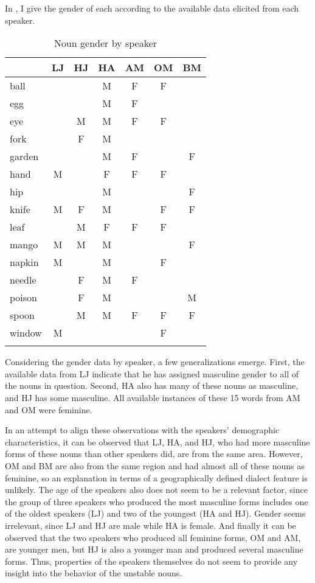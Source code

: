 \documentclass[output=paper,modfonts]{langscibook}
\begin{document}
In , I give the gender of each  according to the available data elicited from each speaker.


\begin{table}
\caption{Noun gender by speaker}
\label{ex:paster:12}
\begin{tabularx}{.55\textwidth}{Xcccccc} 
\lsptoprule
& \textbf{LJ} & \textbf{HJ} & \textbf{HA} & \textbf{AM} & \textbf{OM} & \textbf{BM}\\
\midrule
ball   &  &  & M & F & F & \\
egg    &  &  & M & F &  & \\
eye    &  & M & M & F & F & \\
fork   &  & F & M &  &  & \\
garden &  &  & M & F &  & F\\
hand   & M &  & F & F & F & \\
hip    &  &  & M &  &  & F\\
knife  & M & F & M &  & F & F\\
leaf   &  & M & F & F & F & \\
mango  & M & M & M &  &  & F\\
napkin & M &  & M &  & F & \\
needle &  & F & M & F &  & \\
poison &  & F & M &  &  & M\\
spoon  &  & M & M & F & F & F\\
window & M &  &  &  & F & \\
\lspbottomrule
\end{tabularx}
\end{table}

Considering the  gender data by speaker, a few generalizations emerge. First, the available data from LJ indicate that he has assigned masculine gender to all of the nouns in question. Second, HA also has many of these nouns as masculine, and HJ has some masculine. All available instances of these 15 words from AM and OM were feminine.

In an attempt to align these observations with the speakers’ demographic characteristics, it can be observed that LJ, HA, and HJ, who had more masculine forms of these nouns than other speakers did, are from the same area. However, OM and BM are also from the same region and had almost all of these nouns as feminine, so an explanation in terms of a geographically defined dialect feature is unlikely. The age of the speakers also does not seem to be a relevant factor, since the group of three speakers who produced the most masculine forms includes one of the oldest speakers (LJ) and two of the youngest (HA and HJ). Gender seems irrelevant, since LJ and HJ are male while HA is female. And finally it can be observed that the two speakers who produced all feminine forms, OM and AM, are younger men, but HJ is also a younger man and produced several masculine forms. Thus, properties of the speakers themselves do not seem to provide any insight into the behavior of the unstable nouns.
\end{document}
